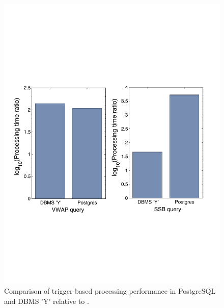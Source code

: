 \begin{figure}[tb]
\includegraphics[scale=0.43]{../plots/trigger_comparison.pdf}
\caption{Comparison of trigger-based processing performance in PostgreSQL and
DBMS 'Y' relative to \compiler.}
\label{fig:triggercomp}
\end{figure}

